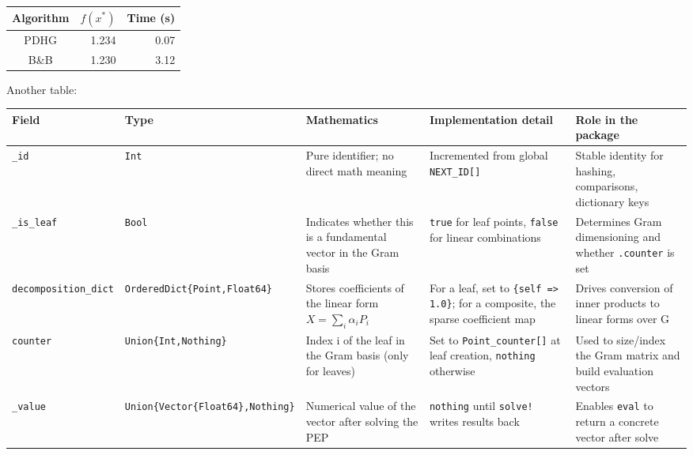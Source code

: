 \documentclass{article}
\begin{document}
\begin{tabular}{crr}
\toprule
Algorithm & $f(x^*)$ & Time (s) \\
\midrule
PDHG & 1.234 & 0.07 \\
B\&B & 1.230 & 3.12 \\
\bottomrule
\end{tabular}


Another table: 


\begin{tabularx}{\textwidth}{XXXXX}
\toprule
Field & Type & Mathematics & Implementation detail & Role in the package \\
\midrule
\texttt{\_id} & \texttt{Int} & Pure identifier; no direct math meaning & Incremented from global \texttt{NEXT\_ID[]} & Stable identity for hashing, comparisons, dictionary keys \\
\texttt{\_is\_leaf} & \texttt{Bool} & Indicates whether this is a fundamental vector in the Gram basis & \texttt{true} for leaf points, \texttt{false} for linear combinations & Determines Gram dimensioning and whether \texttt{.counter} is set \\
\texttt{decomposition\_dict} & \texttt{OrderedDict\{Point,Float64\}} & Stores coefficients of the linear form $X=\sum_i \alpha_i P_i$ & For a leaf, set to \texttt{\{self => 1.0\}}; for a composite, the sparse coefficient map & Drives conversion of inner products to linear forms over G \\
\texttt{counter} & \texttt{Union\{Int,Nothing\}} & Index i of the leaf in the Gram basis (only for leaves) & Set to \texttt{Point\_counter[]} at leaf creation, \texttt{nothing} otherwise & Used to size/index the Gram matrix and build evaluation vectors \\
\texttt{\_value} & \texttt{Union\{Vector\{Float64\},Nothing\}} & Numerical value of the vector after solving the PEP & \texttt{nothing} until \texttt{solve!} writes results back & Enables \texttt{eval} to return a concrete vector after solve \\
\bottomrule
\end{tabularx}
\end{document}
